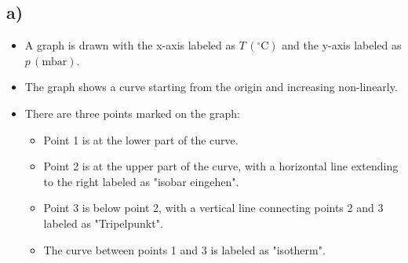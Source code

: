 

\subsection*{a)}

\begin{itemize}
    \item A graph is drawn with the x-axis labeled as \( T \, (^\circ \text{C}) \) and the y-axis labeled as \( p \, (\text{mbar}) \).
    \item The graph shows a curve starting from the origin and increasing non-linearly.
    \item There are three points marked on the graph:
        \begin{itemize}
            \item Point 1 is at the lower part of the curve.
            \item Point 2 is at the upper part of the curve, with a horizontal line extending to the right labeled as "isobar eingehen".
            \item Point 3 is below point 2, with a vertical line connecting points 2 and 3 labeled as "Tripelpunkt".
            \item The curve between points 1 and 3 is labeled as "isotherm".
        \end{itemize}
\end{itemize}